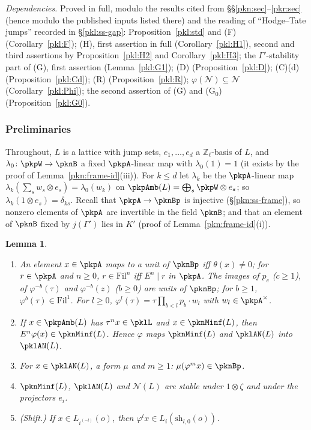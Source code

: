 \documentclass[10pt]{amsart}
\newtheorem{lemma}[theorem]{Lemma}
\theoremstyle{definition}
\theoremstyle{remark}
\newcommand{\Z}{\mathbb Z}
\begin{document}
\emph{Dependencies.} Proved in full, modulo the results cited from \S\S\ref{pkn:sec}--\ref{pkr:sec} (hence
modulo the published inputs listed there) and the reading of ``Hodge--Tate jumps'' recorded in
\S\ref{pkl:ss-gap}: Proposition~\ref{pkl:std} and (F) (Corollary~\ref{pkl:F}); (H), first assertion in
full (Corollary~\ref{pkl:H1}), second and third assertions by
Proposition~\ref{pkl:H2} and Corollary~\ref{pkl:H3}; the $\Gamma'$-stability part of (G), first assertion
(Lemma~\ref{pkl:G1}); (D) (Proposition~\ref{pkl:D}); (C)(d) (Proposition~\ref{pkl:Cd}); (R)
(Proposition~\ref{pkl:R}); $\varphi(\mathcal N)\subseteq\mathcal N$ (Corollary~\ref{pkl:Phi}); the second assertion of (G) and (G$_0$) (Proposition~\ref{pkl:G0}).

\subsubsection{Preliminaries}\label{pkl:ss-pre}

Throughout, $L$ is a lattice with jump sets, $e_1,\dots,e_d$ a $\Z_\ell$-basis of $L$, and $\lambda_0\colon
\pkpW\to\pknB$ a fixed $\pkpA$-linear map with $\lambda_0(1)=1$ (it exists by the proof of
Lemma~\ref{pkn:frame-id}(iii)). For $k\le d$ let $\lambda_k$ be the $\pkpA$-linear map
$\lambda_k(\sum_sw_s\otimes e_s)=\lambda_0(w_k)$ on $\pkpAmb(L)=\bigoplus_s\pkpW\otimes e_s$; so
$\lambda_k(1\otimes e_s)=\delta_{ks}$. Recall that $\pkpA\to\pknBp$ is injective (\S\ref{pkn:ss-frame}),
so nonzero elements of $\pkpA$ are invertible in the field $\pknB$; and that an element of $\pknB$ fixed by
$j(\Gamma')$ lies in $K'$ (proof of Lemma~\ref{pkn:frame-id}(i)).

\begin{lemma}\label{pkl:basic}
\begin{enumerate}
\item[(i)] An element $x\in\pkpA$ maps to a unit of $\pknBp$ iff $\theta(x)\ne0$; for $r\in\pkpA$ and $n\ge0$,
$r\in\mathrm{Fil}^n$ iff $E^n\mid r$ in $\pkpA$. The images of $p_c$ ($c\ge1$), of $\varphi^{-b}(\tau)$ and
$\varphi^{-b}(z)$ ($b\ge0$) are units of $\pknBp$; for $b\ge1$, $\varphi^b(\tau)\in\mathrm{Fil}^1$. For
$l\ge0$, $\varphi^l(\tau)=\tau\prod_{b<l}p_b\cdot w_l$ with $w_l\in\pkpA^\times$.
\item[(ii)] If $x\in\pkpAmb(L)$ has $\tau^nx\in\pklL$ and $x\in\pknMinf(L)$, then $E^n\varphi(x)\in
\pknMinf(L)$. Hence $\varphi$ maps $\pknMinf(L)$ and $\pklAN(L)$ into $\pklAN(L)$.
\item[(iii)] For $x\in\pklAN(L)$, a form $\mu$ and $m\ge1$: $\mu(\varphi^mx)\in\pknBp$.
\item[(iv)] $\pknMinf(L)$, $\pklAN(L)$ and $\mathcal N(L)$ are stable under $1\otimes\zeta$ and under the
projectors $e_i$.
\item[(v)] (Shift.) If $x\in L_{i^{(-l)}}(o)$, then $\varphi^lx\in L_i(\mathrm{sh}_{l,0}(o))$.
\end{enumerate}
\end{lemma}
\end{document}
